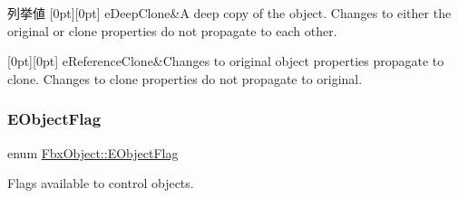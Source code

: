 \begin{DoxyEnumFields}{列挙値}
[0pt][0pt]{}\mbox{\label{class_fbx_object_a9f5626b2d2135684d6ea1e6e4ad2acbbaacdf137ca059c572798287e98c4236d0}} 
e\+Deep\+Clone&A deep copy of the object. Changes to either the original or clone properties do not propagate to each other. \\
\hline

[0pt][0pt]{}\mbox{\label{class_fbx_object_a9f5626b2d2135684d6ea1e6e4ad2acbbae681cda4dccb3f5ccf260e5ccc47d88c}} 
e\+Reference\+Clone&Changes to original object properties propagate to clone. Changes to clone properties do not propagate to original. \\
\hline

\end{DoxyEnumFields}
\mbox{\label{class_fbx_object_a117b8002963e9fe475a93556c217b244}} 
\subsubsection{\texorpdfstring{E\+Object\+Flag}{EObjectFlag}}
{\footnotesize\ttfamily enum \hyperlink{class_fbx_object_a117b8002963e9fe475a93556c217b244}{Fbx\+Object\+::\+E\+Object\+Flag}}



Flags available to control objects. 

